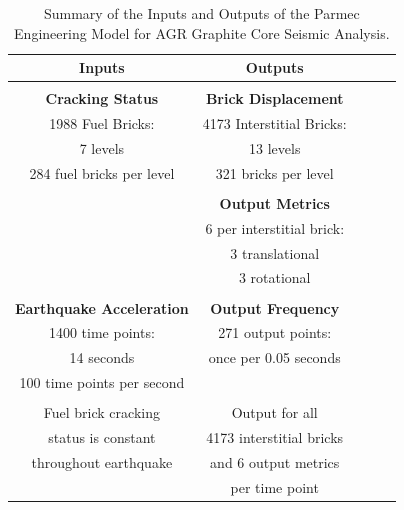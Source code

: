 \begin{table}[h!]
	   \begin{center}
		
		\begin{tabular}{c|c|c|r|c} %
			\textbf{Inputs} & \textbf{Outputs}  \\
			
			\hline
			& \\
			\textbf{Cracking Status}   &  \textbf{ Brick Displacement} \\
			1988 Fuel Bricks:         & 4173 Interstitial Bricks: \\ 
			7 levels    & 13 levels       \\
			284 fuel bricks per level &  321 bricks per level  \\
			&    \\
			& \textbf{Output Metrics}  \\
			& 6 per interstitial brick: \\ 
			
			&  3 translational \\
			&  3 rotational \\
			
			& \\
			
			\textbf{Earthquake Acceleration} & \textbf{Output Frequency} \\
			1400 time points: &              271 output points:     \\
			14 seconds &  once per 0.05 seconds    \\
			100 time points per second &     \\
			
			& \\
			
			Fuel brick cracking & Output for all \\
			status is constant & 4173 interstitial bricks \\
			throughout earthquake & and 6 output metrics \\
			& per time point \\
			
			
		\end{tabular}
		\caption{Summary of the Inputs and Outputs of the Parmec Engineering Model for AGR Graphite Core Seismic Analysis.}
		\label{tab:parmecIO}
		   \end{center}
\end{table}


